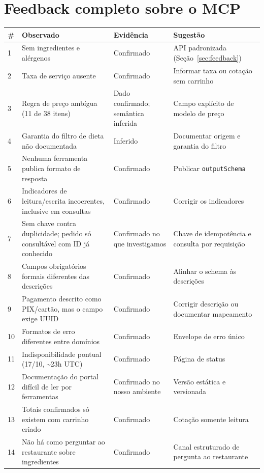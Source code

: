 \documentclass[11pt,a4paper]{article}
\begin{document}
\section{Feedback completo sobre o MCP}\label{anx:feedback}

\begin{center}
\footnotesize
\begin{tabularx}{\linewidth}{>{\raggedright}p{0.4cm}>{\raggedright}p{4.3cm}>{\raggedright}p{1.9cm}Y}
\toprule
\textbf{\#} & \textbf{Observado} & \textbf{Evidência} & \textbf{Sugestão} \\
 & Sem ingredientes e alérgenos & Confirmado & API padronizada (Seção~\ref{sec:feedback}) \\
2 & Taxa de serviço ausente & Confirmado & Informar taxa ou cotação sem carrinho \\
3 & Regra de preço ambígua (11 de 38 itens) & Dado confirmado; semântica inferida & Campo explícito de modelo de preço \\
4 & Garantia do filtro de dieta não documentada & Inferido & Documentar origem e garantia do filtro \\
5 & Nenhuma ferramenta publica formato de resposta & Confirmado & Publicar \texttt{outputSchema} \\
6 & Indicadores de leitura/escrita incoerentes, inclusive em consultas & Confirmado & Corrigir os indicadores \\
7 & Sem chave contra duplicidade; pedido só consultável com ID já conhecido & Confirmado no que investigamos & Chave de idempotência e consulta por requisição \\
8 & Campos obrigatórios formais diferentes das descrições & Confirmado & Alinhar o schema às descrições \\
9 & Pagamento descrito como PIX/cartão, mas o campo exige UUID & Confirmado & Corrigir descrição ou documentar mapeamento \\
10 & Formatos de erro diferentes entre domínios & Confirmado & Envelope de erro único \\
11 & Indisponibilidade pontual (17/10, \textasciitilde23h UTC) & Confirmado & Página de status \\
12 & Documentação do portal difícil de ler por ferramentas & Confirmado no nosso ambiente & Versão estática e versionada \\
13 & Totais confirmados só existem com carrinho criado & Confirmado & Cotação somente leitura \\
14 & Não há como perguntar ao restaurante sobre ingredientes & Confirmado & Canal estruturado de pergunta ao restaurante \\
\bottomrule
\end{tabularx}
\end{center}
\end{document}
